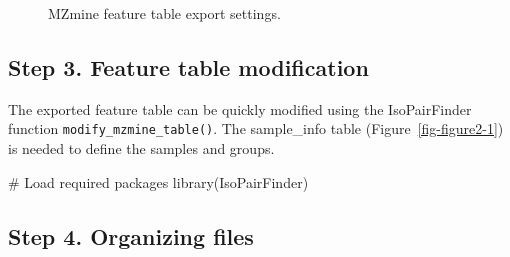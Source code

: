 \documentclass[
  letterpaper,
  DIV=11,
  numbers=noendperiod]{scrreprt}
\newenvironment{Shaded}{\begin{snugshade}}{\end{snugshade}}
\newcommand{\CommentTok}[1]{\textcolor[rgb]{0.37,0.37,0.37}{#1}}
\newcommand{\FunctionTok}[1]{\textcolor[rgb]{0.28,0.35,0.67}{#1}}
\newcommand{\NormalTok}[1]{\textcolor[rgb]{0.00,0.23,0.31}{#1}}
\begin{document}
\begin{figure}


\caption{\label{fig-figure2-6}MZmine feature table export settings.}

\end{figure}%

\subsection{Step 3. Feature table
modification}\label{step-3.-feature-table-modification-2}

The exported feature table can be quickly modified using the
IsoPairFinder function \texttt{modify\_mzmine\_table()}. The
sample\_info table (Figure~\ref{fig-figure2-1}) is needed to define the
samples and groups.

\begin{Shaded}
\begin{Highlighting}[]
\CommentTok{\# Load required packages}
\FunctionTok{library}\NormalTok{(IsoPairFinder)}
\end{Highlighting}
\end{Shaded}

\subsection{Step 4. Organizing files}\label{step-4.-organizing-files-2}
\end{document}
